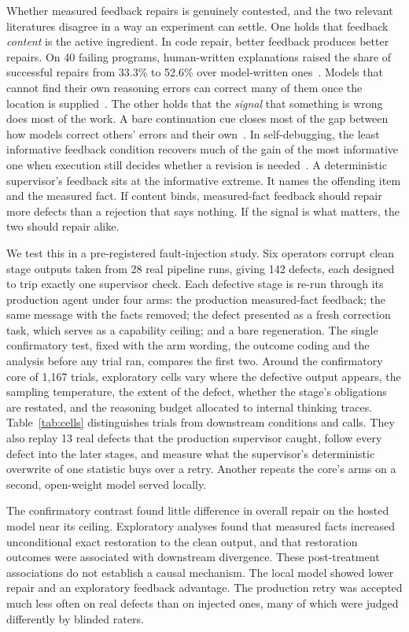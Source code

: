 Whether measured feedback repairs is genuinely contested, and the two relevant
literatures disagree in a way an experiment can settle. One holds that feedback
\emph{content} is the active ingredient. In code repair, better feedback
produces better repairs. On 40 failing programs, human-written explanations
raised the share of successful repairs from 33.3\% to 52.6\% over model-written
ones~\citep{olausson2024selfrepair}. Models that cannot find their own reasoning
errors can correct many of them once the location is
supplied~\citep{tyen2024}. The other holds
that the \emph{signal} that something is wrong does most of the work. A bare
continuation cue closes most of the gap between how models correct others'
errors and their own~\citep{tsui2026scbench}. In self-debugging, the least
informative feedback condition recovers much of the gain of the most
informative one when execution still decides whether a revision is
needed~\citep{chen2024selfdebug}. A deterministic supervisor's feedback sits at
the informative extreme. It names the offending item and the measured fact.
If content binds, measured-fact feedback should repair more defects than a
rejection that says nothing. If the signal is what matters, the two should
repair alike.

We test this in a pre-registered fault-injection study. Six operators corrupt
clean stage outputs taken from 28 real pipeline runs, giving 142 defects, each
designed to trip exactly one supervisor check. Each defective stage is re-run
through its production agent under four arms: the production measured-fact
feedback; the same message with the facts removed; the defect presented as a
fresh correction task, which serves as a capability ceiling; and a bare
regeneration. The single confirmatory test, fixed with the arm wording, the
outcome coding and the analysis before any trial ran, compares the first two.
Around the confirmatory core of 1{,}167 trials, exploratory cells vary
where the defective output appears, the sampling temperature, the extent of
the defect, whether the stage's obligations are restated, and the reasoning
budget allocated to internal thinking traces. Table~\ref{tab:cells} distinguishes trials from downstream conditions and calls. They also replay 13 real defects that the production
supervisor caught, follow every defect into the later stages, and measure what
the supervisor's deterministic overwrite of one statistic buys over a retry.
Another repeats the core's arms on a second, open-weight model served locally.

The confirmatory contrast found little difference in overall repair on the
hosted model near its ceiling. Exploratory analyses found that measured facts
increased unconditional exact restoration to the clean output, and that
restoration outcomes were associated with downstream divergence. These
post-treatment associations do not establish a causal mechanism. The local
model showed lower repair and an exploratory feedback advantage. The production
retry was accepted much less often on real defects than on injected ones, many
of which were judged differently by blinded raters.

